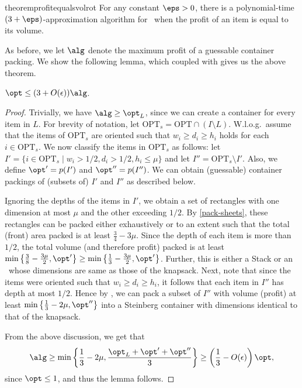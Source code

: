 \begin{restatable}{theorem}{profitequalsvolrot}
    \label{thm:r3dkrp}
   For any constant $\eps>0$, there is a polynomial-time $(3 +\eps)$-approximation algorithm for \tdkr~when the profit of an item is equal to its volume.  
\end{restatable}

As before, we let $\alg$ denote the maximum profit of a guessable container packing. We show the following lemma, which coupled with  gives us the above theorem.

\begin{lemma}
    $\opt \le (3+O(\epsilon))\alg$.
\end{lemma}
\begin{proof}
    Trivially, we have $\alg \ge \opt_L$, since we can create a  container for every item in $L$. For brevity of notation, let $\text{OPT}_s = \text{OPT}\cap (I\setminus L)$. W.l.o.g.~assume that the items of $\text{OPT}_s$ are oriented such that $w_i \ge d_i \ge h_i$ holds for each $i\in \text{OPT}_s$. We now classify the items in $\text{OPT}_s$ as follows: let $I' = \{i \in \text{OPT}_s \mid w_i > 1/2, d_i > 1/2, h_i \le \mu\}$ and let $I'' = \text{OPT}_s \setminus I'$. Also, we define $\opt' = p(I')$ and $\opt'' = p(I'')$. We can obtain (guessable) container packings of (subsets of) $I'$ and $I''$ as described below.

    Ignoring the depths of the items in $I'$, we obtain a set of rectangles with one dimension at most $\mu$ and the other exceeding $1/2$. By \cref{pack-sheets}, these rectangles can be packed either exhaustively or to an extent such that the total (front) area packed is at least $\frac{3}{4}-3\mu$. Since the depth of each item is more than $1/2$, the total volume (and therefore profit) packed is at least $\min\left\{\frac{3}{8}-\frac{3\mu}{2},\opt'\right\}\ge\min\left\{\frac{1}{3}-\frac{3\mu}{2},{\opt'}\right\}$. Further, this is either a Stack or an \LContainer~whose dimensions are same as those of the knapsack.
    Next, note that since the items were oriented such that $w_i \ge d_i \ge h_i$, it follows that each item in $I''$ has depth at most $1/2$. Hence by , we can pack a subset of $I''$ with volume (profit) at least $\min\left\{\frac{1}{3}-2\mu, \opt''\right\}$ into a Steinberg container with dimensions identical to that of the knapsack.

    From the above discussion, we get that
    \[ \alg \ge \min\left\{\frac13-2\mu,\frac{{\opt_L}+{\opt'}+{\opt''}}{3}\right\} \ge \left(\frac{1}{3}-O(\epsilon)\right)\opt,\]
    since $\opt\le 1$, and thus the lemma follows.
\end{proof}
